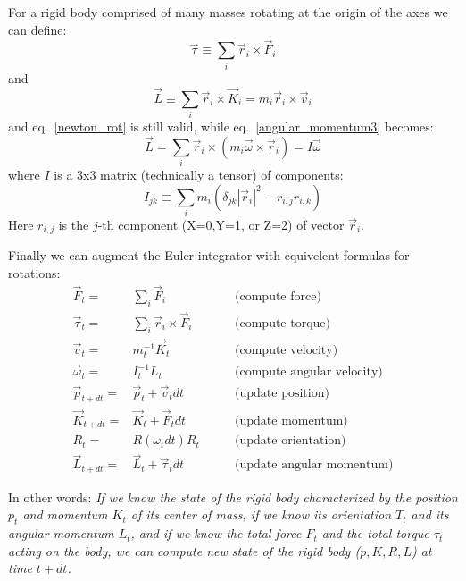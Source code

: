 \documentclass[12pt]{article}
\begin{document}
For a rigid body comprised of many masses rotating at the origin of the axes we can define:
\begin{equation}
\vec \tau \equiv \sum_i \vec r_i \times \vec F_i
\end{equation}
and
\begin{equation}
\vec L \equiv \sum_i \vec r_i \times \vec K_i = m_i  \vec r_i \times \vec v_i
\label{angular_momentum3}
\end{equation}
and eq.~\ref{newton_rot} is still valid, while eq.~\ref{angular_momentum3} becomes:
\begin{equation}
\vec L = \sum _i \vec r_i \times (m_i \vec \omega \times \vec r_i) = I \vec \omega
\label{angular_momentum4}
\end{equation}
where $I$ is a 3x3 matrix (technically a tensor) of components:
\begin{equation}
I_{jk} \equiv \sum_i m_i (\delta_{jk} |\vec r_i|^2 - r_{i,j} r_{i,k})
\label{momentum_inertia}
\end{equation}
Here $r_{i,j}$ is the $j$-th component (X=0,Y=1, or Z=2) of vector $\vec r_i$.


Finally we can augment the Euler integrator with equivelent formulas for rotations:
\begin{eqnarray}
\vec F_t =& \sum_i \vec F_i & \qquad \textrm{(compute force)} \\
\vec \tau_t =& \sum_i \vec r_i \times \vec F_i & \qquad \textrm{(compute torque)}\\
\vec v_{t} =& m_t^{-1}\vec K_{t} & \qquad \textrm{(compute velocity)}\\
\vec \omega_t =& I_t^{-1} L_t & \qquad \textrm{(compute angular velocity)}\\
\vec p_{t+dt} =& \vec p_t + \vec v_t dt & \qquad \textrm{(update position)}\\
\vec K_{t+dt} =& \vec K_t + \vec F_t dt & \qquad \textrm{(update momentum)}\\
R_t = & R(\omega_t dt) R_t & \qquad \textrm{(update orientation)}\\
\vec L_{t+dt} =& \vec L_t + \vec \tau_t dt & \qquad \textrm{(update angular momentum)}
\label{euler22}
\end{eqnarray}

In other words: {\it If we know the state of the rigid body characterized by the position $p_t$ and momentum $K_t$ of its center of mass, if we know its orientation $T_t$ and its angular momentum $L_t$, and if we know the total force $F_t$ and the total torque $\tau_t$ acting on the body, we can compute new state of the rigid body ($p,K,R,L$) at time $t+dt$.}
\end{document}
